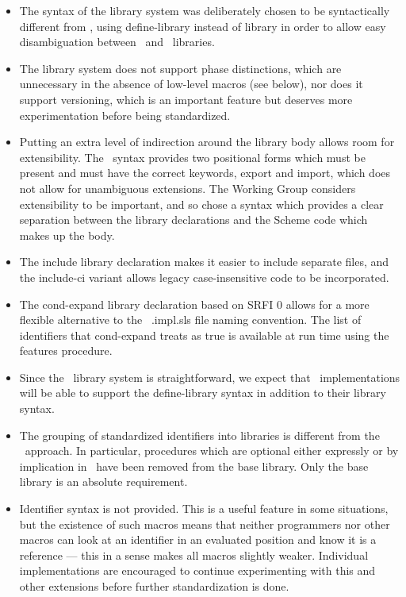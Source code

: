 \begin{itemize}
\item The syntax of the library system was deliberately chosen to be
syntactically different from \rsixrs, using {\cf define-library} instead of
{\cf library} in order to allow easy disambiguation between \rsixrs\
and \rsevenrs\ libraries.

\item The library system does not support phase distinctions, which
are unnecessary in the absence of low-level macros (see below),
nor does it support versioning, which is an important feature but deserves more
experimentation before being standardized.

\item Putting an extra level of indirection around the library body
allows room for extensibility. The \rsixrs\ syntax provides two positional
forms which must be present and must have the correct keywords,
{\cf export} and {\cf import}, which does not allow for unambiguous
extensions. The Working Group considers extensibility to be important,
and so chose a syntax which provides
a clear separation between the library declarations and the Scheme code
which makes up the body.

\item The {\cf include} library declaration
makes it easier to include separate files, 
and the {\cf include-ci} variant allows legacy 
case-insensitive code to be incorporated.

\item The {\cf cond-expand} library declaration based on SRFI 0 allows for a more
flexible alternative to the \rsixrs\ {\cf .impl.sls} file naming
convention.
The list of identifiers that {\cf cond-expand} treats as true is
available at run time using the {\cf features} procedure.

\item Since the \rsevenrs\ library system is straightforward, we expect
that \rsixrs\ implementations will be able to support the {\cf define-library}
syntax in addition to their {\cf library} syntax.

\item The grouping of standardized identifiers into libraries is different from the \rsixrs\
approach. In particular, procedures which are optional either expressly
or by implication in \rfivers\ have been removed from the base library.
Only the base library is an absolute requirement.

\item Identifier syntax is not provided. This is a useful feature in
some situations, but the existence of such macros means that neither
programmers nor other macros can look at an identifier in an evaluated
position and know it is a reference --- this in a sense makes all macros
slightly weaker. Individual implementations are encouraged to continue
experimenting with this and other extensions before further standardization is done.


\end{itemize}
